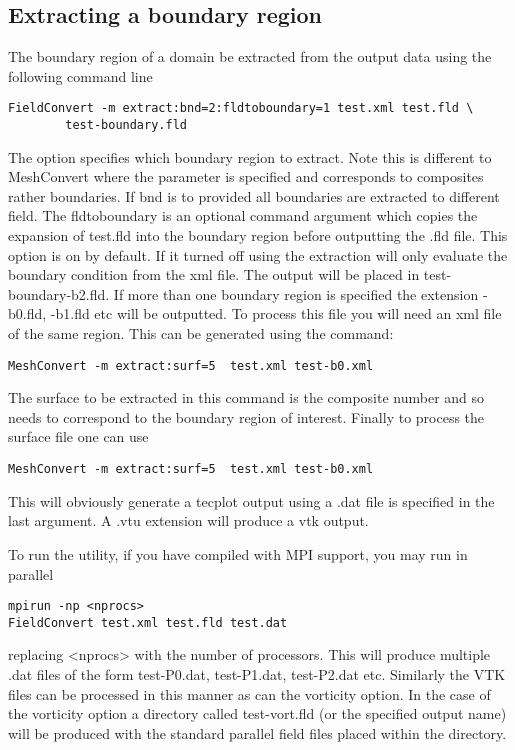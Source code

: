 \subsection{Extracting a boundary region}
The boundary region of a domain be extracted from the output data using the following command line
\begin{lstlisting}[style=BashInputStyle]
FieldConvert -m extract:bnd=2:fldtoboundary=1 test.xml test.fld \
        test-boundary.fld
\end{lstlisting}
The option  specifies which boundary region to extract. Note this is different to MeshConvert where the parameter  is specified and corresponds to composites rather boundaries. If bnd is to provided all boundaries are extracted to different field. The fldtoboundary is an optional command argument which copies the expansion of test.fld into the boundary region before outputting the .fld file. This option is on by default. If it turned off using  the extraction will only evaluate the boundary condition from the xml file. The output will be placed in test-boundary-b2.fld. If more than one boundary region is specified the extension -b0.fld, -b1.fld etc will be outputted. To process this file you will need an xml file of the same region. This can be generated using the command:
\begin{lstlisting}[style=BashInputStyle]
MeshConvert -m extract:surf=5  test.xml test-b0.xml
\end{lstlisting}
The surface to be extracted in this command is the composite number and so needs to correspond to the boundary region of interest. Finally to process the surface file one can use
\begin{lstlisting}[style=BashInputStyle]
MeshConvert -m extract:surf=5  test.xml test-b0.xml
\end{lstlisting}
This will obviously generate a tecplot output using a .dat file is specified in the last argument. A .vtu extension will produce a vtk output.

To run the utility, if you have compiled \nekpp with MPI support, you may run in
parallel
\begin{lstlisting}[style=BashInputStyle] mpirun -np <nprocs>
FieldConvert test.xml test.fld test.dat
\end{lstlisting}
replacing <nprocs> with the number of processors. This will produce multiple
.dat files of the form test-P0.dat, test-P1.dat, test-P2.dat etc. Similarly the
VTK files can be processed in this manner as can the vorticity option. In the
case of the vorticity option a directory called test-vort.fld (or the specified
output name) will be produced with the standard parallel field files placed
within the directory.
